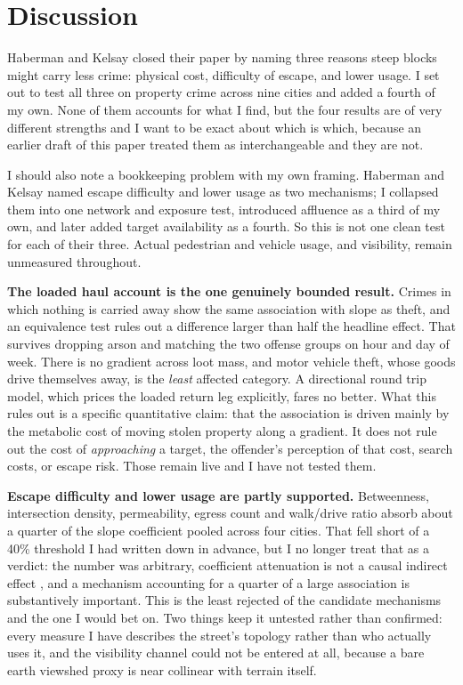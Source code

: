 \documentclass[10pt,letterpaper]{article}
\begin{document}
\section*{Discussion}

Haberman and Kelsay closed their paper by naming three reasons steep blocks might
carry less crime: physical cost, difficulty of escape, and lower usage. I set out to
test all three on property crime across nine cities and added a fourth of my own.
None of them accounts for what I find, but the four results are of very different
strengths and I want to be exact about which is which, because an earlier draft of
this paper treated them as interchangeable and they are not.

I should also note a bookkeeping problem with my own framing. Haberman and Kelsay
named escape difficulty and lower usage as two mechanisms; I collapsed them into one
network and exposure test, introduced affluence as a third of my own, and later added
target availability as a fourth. So this is not one clean test for each of their
three. Actual pedestrian and vehicle usage, and visibility, remain unmeasured
throughout.

\textbf{The loaded haul account is the one genuinely bounded result.} Crimes in which
nothing is carried away show the same association with slope as theft, and an
equivalence test rules out a difference larger than half the headline effect. That
survives dropping arson and matching the two offense groups on hour and day of week.
There is no gradient across loot mass, and motor vehicle theft, whose goods drive
themselves away, is the \emph{least} affected category. A directional round trip
model, which prices the loaded return leg explicitly, fares no better. What this
rules out is a specific quantitative claim: that the association is driven mainly by
the metabolic cost of moving stolen property along a gradient. It does not rule out
the cost of \emph{approaching} a target, the offender's perception of that cost,
search costs, or escape risk. Those remain live and I have not tested them.

\textbf{Escape difficulty and lower usage are partly supported.} Betweenness,
intersection density, permeability, egress count and walk/drive ratio absorb about a
quarter of the slope coefficient pooled across four cities. That fell short of a 40\%
threshold I had written down in advance, but I no longer treat that as a verdict: the
number was arbitrary, coefficient attenuation is not a causal indirect effect
\cite{imai2010}, and a mechanism accounting for a quarter of a large association is
substantively important. This is the least rejected of the candidate mechanisms and
the one I would bet on. Two things keep it untested rather than confirmed: every
measure I have describes the street's topology rather than who actually uses it, and
the visibility channel could not be entered at all, because a bare earth viewshed
proxy is near collinear with terrain itself.
\end{document}

